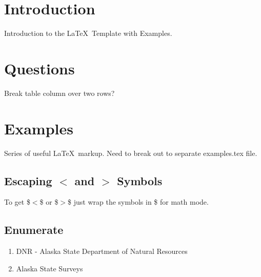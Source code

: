 \documentclass[12pt,letterpaper,dvips]{article}
\newcommand{\FIXME}[1]{\textsf{[FIXME: #1]}}
\newenvironment{itemize*}%
  {\begin{itemize}%
    \setlength{\itemsep}{0pt}%
    \setlength{\parsep}{0pt}}%
  {\end{itemize}}
\begin{document}
\section{Introduction}
Introduction to the \LaTeX\ Template with Examples.


\section{Questions}
\begin{itemize*}
     \item{} Break table column over two rows?
\end{itemize*}



\newpage
\section{Examples}
Series of useful \LaTeX\ markup. Need to break out to 
separate examples.tex file.

\subsection{Escaping $<$ and $>$ Symbols}
To get \$$<$\$ or \$$>$\$ just wrap the symbols in \$ for math mode.

\subsection{Enumerate}
\begin{enumerate}
  \item{DNR} - Alaska State Department of Natural Resources

  \item{Alaska State Surveys}
\end{enumerate}
\end{document}
